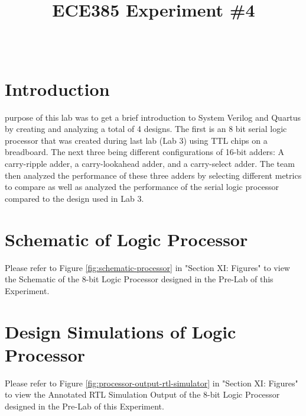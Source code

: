 \documentclass[journal, twocolumn, final,11pt,letterpaper]{IEEEtran}
\title{ECE385 Experiment \#4
	}
\author{
\IEEEauthorblockN{Eric Meyers, Ryan Helsdingen}\\
\IEEEauthorblockA{Section ABG; TAs: Ben Delay, Shuo Liu \\
February 17th, 2016 \\
emeyer7, helsdin2}}
\begin{document}
	
\maketitle
\singlespacing

\section{Introduction}
 purpose of this lab was to get a brief introduction to System Verilog and Quartus by creating and analyzing a total of 4 designs. The first is an 8 bit serial logic processor that was created during last lab (Lab 3) using TTL chips on a breadboard. The next three being different configurations of 16-bit adders: A carry-ripple adder, a carry-lookahead adder, and a carry-select adder. The team then analyzed the performance of these three adders by selecting different metrics to compare as well as analyzed the performance of the serial logic processor compared to the design used in Lab 3.

\section{Schematic of Logic Processor}
Please refer to Figure \ref{fig:schematic-processor} in "Section XI: Figures" to view the Schematic of the 8-bit Logic Processor designed in the Pre-Lab of this Experiment.

\section{Design Simulations of Logic Processor}
Please refer to Figure \ref{fig:processor-output-rtl-simulator} in "Section XI: Figures" to view the Annotated RTL Simulation Output of the 8-bit Logic Processor designed in the Pre-Lab of this Experiment.

\end{document}
